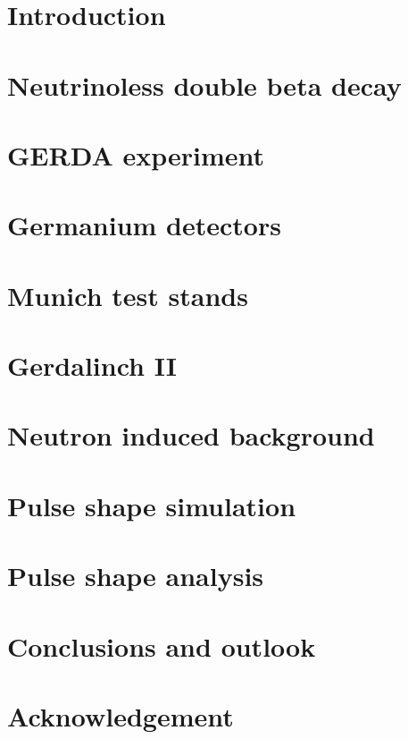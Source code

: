 \documentclass[11pt,a4]{book}
\begin{document}


 

\tableofcontents
\clearpage
{}
\setcounter{page}{1}

\chapter{Introduction}
\label{cha:intro}


\chapter{Neutrinoless double beta decay}
\label{cha:theory}


\chapter{GERDA experiment}
\label{cha:gerda}


\chapter{Germanium detectors}
\label{cha:detector}


\chapter{Munich test stands}
\label{cha:teststand}


\chapter{Gerdalinch II}
\label{cha:gerdalinchenII}


\chapter{Neutron induced background}
\label{cha:neutron}


\chapter{Pulse shape simulation}
\label{cha:pss}


\chapter{Pulse shape analysis}
\label{cha:psa}


\chapter{Conclusions and outlook}
\label{cha:con}


\chapter*{Acknowledgement}
\label{cha:ack}
 

\begin{thebibliography}{99}
  
\end{thebibliography}
\end{document}
